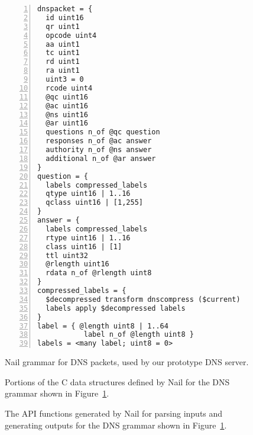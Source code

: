 \begin{figure}
\smaller[1.0]
\begin{Verbatim}[numbers=left, xleftmargin=3em]
dnspacket = {
  id uint16
  qr uint1
  opcode uint4
  aa uint1
  tc uint1
  rd uint1
  ra uint1
  uint3 = 0
  rcode uint4
  @qc uint16
  @ac uint16
  @ns uint16
  @ar uint16
  questions n_of @qc question
  responses n_of @ac answer
  authority n_of @ns answer
  additional n_of @ar answer
}
question = {
  labels compressed_labels
  qtype uint16 | 1..16
  qclass uint16 | [1,255]
}
answer = {
  labels compressed_labels
  rtype uint16 | 1..16
  class uint16 | [1]
  ttl uint32
  @rlength uint16
  rdata n_of @rlength uint8
}
compressed_labels = {
  $decompressed transform dnscompress ($current)
  labels apply $decompressed labels
}
label = { @length uint8 | 1..64
           label n_of @length uint8 }
labels = <many label; uint8 = 0>
\end{Verbatim}
\caption{Nail grammar for DNS packets, used by our prototype DNS server.}
\label{fig:dns-full}
\end{figure}

\begin{figure}
\smaller[1.0]

\caption{Portions of the C data structures defined by Nail for the DNS
  grammar shown in Figure~\ref{fig:dns-full}.}
\label{fig:dns-full-struct}
\end{figure}

\begin{figure}
\smaller[1.0]

\caption{The API functions generated by Nail for parsing inputs and
  generating outputs for the DNS grammar shown in Figure~\ref{fig:dns-full}.}
\label{fig:dns-full-api}
\end{figure}

